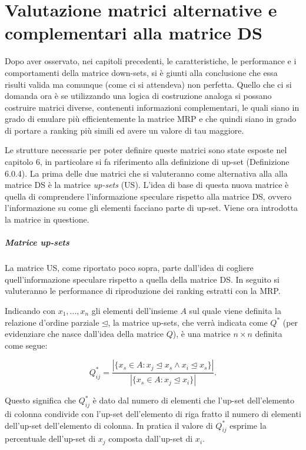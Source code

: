 \documentclass{report}
\begin{document}
\chapter{Valutazione matrici alternative e complementari alla matrice DS}
Dopo aver osservato, nei capitoli precedenti, le caratteristiche, le performance e i comportamenti della matrice down-sets, si è giunti alla conclusione che essa risulti valida ma comunque (come ci si attendeva) non perfetta. Quello che ci si domanda ora è se utilizzando una logica di costruzione analoga si possano costruire matrici diverse, contenenti informazioni complementari, le quali siano in grado di emulare più efficientemente la matrice MRP e che quindi siano in grado di portare a ranking più simili ed avere un valore di tau maggiore.


Le strutture necessarie per poter definire queste matrici sono state esposte nel capitolo 6, in particolare si fa riferimento alla definizione di up-set (Definizione 6.0.4). La prima delle due matrici che si valuteranno come alternativa alla alla matrice DS è la matrice \textit{up-sets} (US). L'idea di base di questa nuova matrice è quella di comprendere l'informazione speculare rispetto alla matrice DS, ovvero l'informazione su come gli elementi facciano parte di up-set. Viene ora introdotta la matrice in questione.

\paragraph{Matrice up-sets}
La matrice US, come riportato poco sopra, parte dall'idea di cogliere quell'informazione speculare rispetto a quella della matrice DS. In seguito si valuteranno le performance di riproduzione dei ranking estratti con la MRP.


Indicando con $x_1, ..., x_n$ gli elementi dell'insieme $A$ sul quale viene definita la relazione d’ordine parziale $\unlhd$, la matrice up-sets, che verrà indicata come $Q^*$ (per evidenziare che nasce dall'idea della matrice $Q$), è una matrice $n\times n$ definita come segue:

\[Q^{*}_{ij} = \frac{|\{x_s\in A:x_j\unlhd x_s \land x_i\unlhd x_s\}|}{|\{x_s\in A:x_j\unlhd x_i\}|}.\]

Questo significa che $Q^{*}_{ij}$ è dato dal numero di elementi che l'up-set dell'elemento di colonna condivide con l'up-set dell'elemento di riga fratto il numero di elementi dell'up-set dell'elemento di colonna. In pratica il valore di $Q^{*}_{ij}$ esprime la percentuale dell'up-set di $x_j$ composta dall'up-set di $x_i$.
\end{document}
